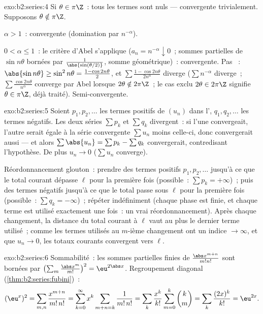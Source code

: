 \begin{solution}{exo:b2:series:4}
Si $\theta \in \pi\Z$~: tous les termes sont nuls --- convergente
trivialement. Supposons $\theta \notin \pi\Z$.

$\alpha > 1$~:  convergente (domination par $n^{-\alpha}$).

$0 < \alpha \leq 1$~: le critère d'Abel s'applique ($a_n = n^{-\alpha}
\downarrow 0$~; sommes partielles de $\sin n\theta$ bornées par
$\frac{1}{\abs{\sin(\theta/2)}}$, somme géométrique)~: convergente.
Pas ~: $\abs{\sin n\theta} \geq \sin^2 n\theta = \frac{1 -
\cos 2n\theta}{2}$, et $\sum \frac{1 - \cos 2n\theta}{2n^\alpha}$
diverge ($\sum n^{-\alpha}$ diverge~; $\sum
\frac{\cos 2n\theta}{n^\alpha}$ converge par Abel lorsque $2\theta
\notin 2\pi\Z$~; le cas exclu $2\theta \in 2\pi\Z$ signifie
$\theta \in \pi\Z$, déjà traité). Semi-convergente.
\end{solution}

\begin{solution}{exo:b2:series:5}
Soient $p_1, p_2, \dots$ les termes positifs de $(u_n)$ dans l',
$q_1, q_2, \dots$ les termes négatifs. Les deux séries $\sum p_k$ et
$\sum q_k$ divergent~: si l'une convergeait, l'autre serait égale à
la série convergente $\sum u_n$ moins celle-ci, donc convergerait
aussi --- et alors $\sum \abs{u_n} = \sum p_k - \sum q_k$
convergerait, contredisant l'hypothèse. De plus $u_n \to 0$ ($\sum
u_n$ converge).

Réordonnancement glouton~: prendre des termes positifs $p_1, p_2,
\dots$ jusqu'à ce que le total courant dépasse $\ell$ pour la
première fois (possible~: $\sum p_k = +\infty$)~; puis des termes
négatifs jusqu'à ce que le total passe sous $\ell$ pour la première
fois (possible~: $\sum q_k = -\infty$)~; répéter indéfiniment (chaque
phase est finie, et chaque terme est utilisé exactement une fois~: un
vrai réordonnancement). Après chaque changement, la distance du total
courant à $\ell$ vaut au plus le dernier terme utilisé~; comme les
termes utilisés au $m$-ième changement ont un indice $\to \infty$, et
que $u_n \to 0$, les totaux courants convergent vers $\ell$.
\end{solution}

\begin{solution}{exo:b2:series:6}
Sommabilité~: les sommes partielles finies de
$\frac{\abs x^{m+n}}{m!n!}$ sont bornées par $\bigl(\sum_m
\frac{\abs x^m}{m!}\bigr)^2 = \eu^{2\abs x}$. Regroupement diagonal
(\cref{thm:b2:series:fubini})~:
\[
(\eu^{x})^2 = \sum_{m,n} \frac{x^{m+n}}{m!\,n!}
= \sum_{k=0}^{\infty} x^k \sum_{m+n=k} \frac{1}{m!\,n!}
= \sum_k \frac{x^k}{k!}\sum_{m=0}^{k}\binom km
= \sum_k \frac{(2x)^k}{k!} = \eu^{2x} .
\]
\end{solution}

